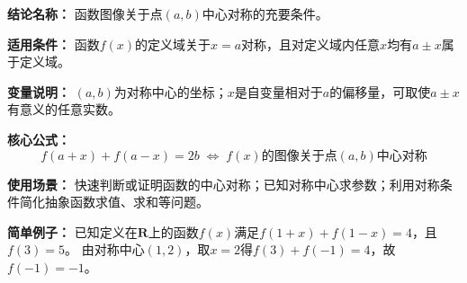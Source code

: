 \textbf{结论名称：} 函数图像关于点$(a,b)$中心对称的充要条件。

\textbf{适用条件：} 函数$f(x)$的定义域关于$x=a$对称，且对定义域内任意$x$均有$a\pm x$属于定义域。

\textbf{变量说明：} $(a,b)$为对称中心的坐标；$x$是自变量相对于$a$的偏移量，可取使$a\pm x$有意义的任意实数。

\textbf{核心公式：}
\[
\boxed{f(a+x)+f(a-x)=2b \;\Longleftrightarrow\; f(x)\text{的图像关于点}(a,b)\text{中心对称}}
\]

\textbf{使用场景：} 快速判断或证明函数的中心对称；已知对称中心求参数；利用对称条件简化抽象函数求值、求和等问题。

\textbf{简单例子：} 已知定义在$\mathbf{R}$上的函数$f(x)$满足$f(1+x)+f(1-x)=4$，且$f(3)=5$。
由对称中心$(1,2)$，取$x=2$得$f(3)+f(-1)=4$，故$f(-1)=-1$。